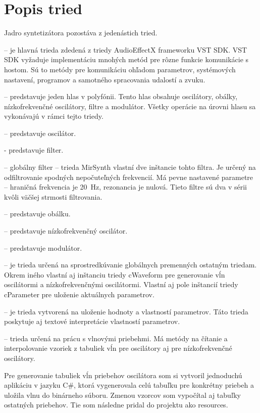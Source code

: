 \section{Popis tried}

Jadro syntetizátora pozostáva z jedenástich tried. 
\begin{description}
\setlength{\itemsep}{-0.5ex}
\item[MirSynth] -- je hlavná trieda zdedená z triedy AudioEffectX frameworku VST SDK. VST SDK vyžaduje implementáciu mnohých metód pre rôzne funkcie komunikácie s hostom. Sú to metódy pre komunikáciu ohľadom parametrov, systémových nastavení, programov a samotného spracovania udalostí a zvuku.
\item[cVoice] -- predstavuje jeden hlas v polyfónii. Tento hlas obsahuje oscilátory, obálky, nízkofrekvenčné oscilátory, filtre a modulátor. Všetky operácie na úrovni hlasu sa vykonávajú v rámci tejto triedy.
\item[cOscillator] -- predstavuje oscilátor.
\item[cFilter] - predstavuje filter.
\item[cGlobFilter] -- globálny filter -- trieda MirSynth vlastní dve inštancie tohto filtra. Je určený na odfiltrovanie spodných nepočuteľných frekvencií. Má pevne nastavené parametre -- hraničná frekvencia je 20~Hz, rezonancia je nulová. Tieto filtre sú dva v sérii kvôli väčšej strmosti filtrovania.
\item[cEnvelope] -- predstavuje obálku.
\item[cLFO] -- predstavuje nízkofrekvenčný oscilátor.
\item[cModulation] -- predstavuje modulátor.
\item[cGlobals] -- je trieda určená na sprostredkúvanie globálnych premenných ostatným triedam. Okrem iného vlastní aj inštanciu triedy cWaveform pre generovanie vĺn oscilátormi a nízkofrekvenčnými oscilátormi. Vlastní aj pole inštancií triedy cParameter pre uloženie aktuálnych parametrov.
\item[cParameter] -- je trieda vytvorená na uloženie hodnoty a vlastností parametrov. Táto trieda poskytuje aj textové interpretácie vlastností parametrov.
\item[cWaveform] -- trieda určená na prácu s vlnovými priebehmi. Má metódy na čítanie a interpolovanie vzoriek z tabuliek vĺn pre oscilátory aj pre nízkofrekvenčné oscilátory.
\end{description}

Pre generovanie tabuliek vĺn priebehov oscilátora som si vytvoril jednoduchú aplikáciu v jazyku C\#, ktorá vygenerovala celú tabuľku pre konkrétny priebeh a uložila vlnu do binárneho súboru. Zmenou vzorcov som vypočítal aj tabuľky ostatných priebehov. Tie som následne pridal do projektu ako resources.

